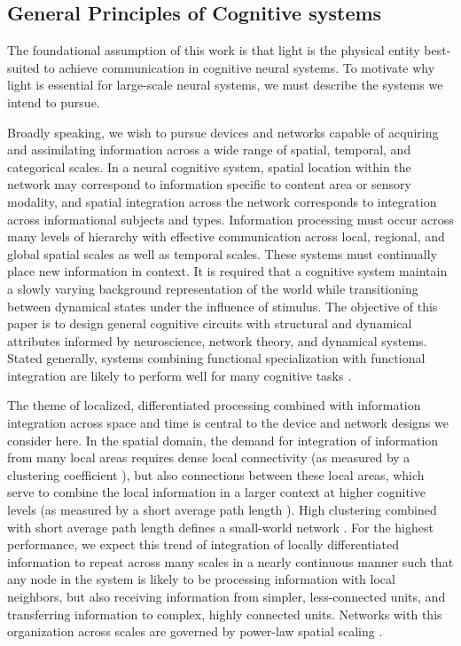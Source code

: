 \documentclass[aip,amsmath,amssymb,reprint,nofootinbib]{revtex4-1}
\begin{document}
\subsection{\label{sec:cognitiveSystems}General Principles of Cognitive systems}
The foundational assumption of this work is that light is the physical entity best-suited to achieve communication in cognitive neural systems. To motivate why light is essential for large-scale neural systems, we must describe the systems we intend to pursue.

Broadly speaking, we wish to pursue devices and networks capable of acquiring and assimilating information across a wide range of spatial, temporal, and categorical scales. In a neural cognitive system, spatial location within the network may correspond to information specific to content area or sensory modality, and spatial integration across the network corresponds to integration across informational subjects and types. Information processing must occur across many levels of hierarchy with effective communication across local, regional, and global spatial scales as well as temporal scales. These systems must continually place new information in context. It is required that a cognitive system maintain a slowly varying background representation of the world while transitioning between dynamical states under the influence of stimulus. The objective of this paper is to design general cognitive circuits with structural and dynamical attributes informed by neuroscience, network theory, and dynamical systems. Stated generally, systems combining functional specialization with functional integration are likely to perform well for many cognitive tasks \cite{spto2000,spto2002}.

The theme of localized, differentiated processing combined with information integration \cite{toed1998,tosp2003,to2004,seiz2006,bato2008,bato2009,base2011} across space \cite{busp2009,sp2010} and time \cite{sase2001,vala2001,enfr2001,budr2004,bu2006} is central to the device and network designs we consider here. In the spatial domain, the demand for integration of information from many local areas requires dense local connectivity (as measured by a clustering coefficient \cite{eskn2015,saki2007,fa2007}), but also connections between these local areas, which serve to combine the local information in a larger context at higher cognitive levels \cite{brto2006} (as measured by a short average path length \cite{alba2002}). High clustering combined with short average path length defines a small-world network \cite{wast1998}. For the highest performance, we expect this trend of integration of locally differentiated information to repeat across many scales in a nearly continuous manner \cite{busp2009,sp2010} such that any node in the system is likely to be processing information with local neighbors, but also receiving information from simpler, less-connected units, and transferring information to complex, highly connected units. Networks with this organization across scales are governed by power-law spatial scaling \cite{baal1999}.
\end{document}
